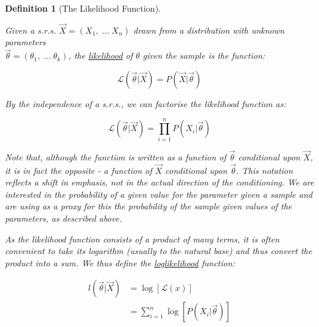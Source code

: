 \documentclass[12pt,a4paper]{article}
\newtheorem{defn}[thm]{Definition}
\begin{document}
\begin{defn}[The Likelihood Function]$\;$\par\vspace{1cm}

Given a s.r.s. $\vec{X} = (X_1,\; \hdots\; X_n)$ drawn from a distribution with unknown parameters \\$\vec{\theta}=(\theta_1,\;\hdots\; \theta_k)$, the \underline{likelihood} of $\theta$ given the sample is the function:

$$\mathcal{L}(\vec{\theta} | \vec{X}) = P(\vec{X} | \vec{\theta})$$

\noindent By the independence of a s.r.s., we can factorise the likelihood function as:

$$\mathcal{L}(\vec{\theta} | \vec{X}) = \prod_{i=1}^n P(X_i | \vec{\theta})$$

Note that, although the function is written as a function of $\vec{\theta}$ conditional upon $\vec{X}$, it is in fact the opposite - a function of $\vec{X}$ conditional upon $\vec{\theta}$. This notation reflects a shift in emphasis, not in the actual direction of the conditioning. We are interested in the probability of a given value for the parameter given a sample and are using as a proxy for this the probability of the sample given values of the parameters, as described above.

As the likelihood function consists of a product of many terms, it is often convenient to take its logarithm (usually to the natural base) and thus convert the product into a sum. We thus define the \underline{loglikelihood} function:

\begin{align*}
l(\vec{\theta} | \vec{X}) &=\log[\mathcal{L}(x)]\\
&= \sum_{i=1}^n \log\left[P\left(X_i | \vec{\theta}\right)\right]
\end{align*}

\end{defn}
\end{document}
